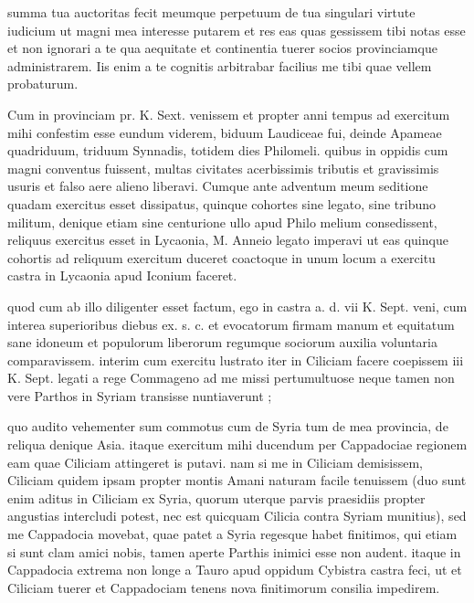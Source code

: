 


 summa tua auctoritas fecit meumque perpetuum de tua singulari virtute iudicium ut magni mea interesse putarem et res eas quas gessissem tibi notas esse et non ignorari a te qua aequitate et continentia tuerer socios provinciamque administrarem. Iis enim a te cognitis arbitrabar facilius me tibi quae vellem probaturum.

 Cum in provinciam pr. K. Sext. venissem et propter anni tempus ad exercitum mihi confestim esse eundum viderem, biduum Laudiceae fui, deinde Apameae quadriduum, triduum Synnadis, totidem dies Philomeli. quibus in oppidis cum magni conventus fuissent, multas civitates acerbissimis tributis et gravissimis usuris et falso aere alieno liberavi. Cumque ante adventum meum seditione quadam exercitus esset dissipatus, quinque cohortes sine legato, sine tribuno militum, denique etiam sine centurione ullo apud Philo melium consedissent, reliquus exercitus esset in Lycaonia, M. Anneio legato imperavi ut eas quinque cohortis ad reliquum exercitum duceret coactoque in unum locum a exercitu castra in Lycaonia apud Iconium faceret.

 quod cum ab illo diligenter esset factum, ego in castra a. d. vii K. Sept. veni, cum interea superioribus diebus ex. s. c. et evocatorum firmam manum et equitatum sane idoneum et populorum liberorum regumque sociorum auxilia voluntaria comparavissem. interim cum exercitu lustrato iter in Ciliciam facere coepissem iii K. Sept. legati a rege Commageno ad me missi pertumultuose neque tamen non vere Parthos in Syriam transisse nuntiaverunt ;

 quo audito vehementer sum commotus cum de Syria tum de mea provincia, de reliqua denique Asia. itaque exercitum mihi ducendum per Cappadociae regionem eam quae Ciliciam attingeret is putavi. nam si me in Ciliciam demisissem, Ciliciam quidem ipsam propter montis Amani naturam facile tenuissem (duo sunt enim aditus in Ciliciam ex Syria, quorum uterque parvis praesidiis propter angustias intercludi potest, nec est quicquam Cilicia contra Syriam munitius), sed me Cappadocia movebat, quae patet a Syria regesque habet finitimos, qui etiam si sunt clam amici nobis, tamen aperte Parthis inimici esse non audent. itaque in Cappadocia extrema non longe a Tauro apud oppidum Cybistra castra feci, ut et Ciliciam tuerer et Cappadociam tenens nova finitimorum consilia impedirem.

